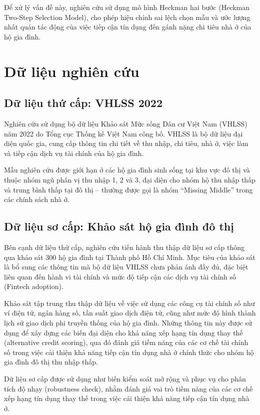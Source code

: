 \documentclass[12pt,a4paper]{report}
\begin{document}
	Để xử lý vấn đề này, nghiên cứu sử dụng mô hình Heckman hai bước (Heckman Two-Step Selection Model), cho phép hiệu chỉnh sai lệch chọn mẫu và ước lượng nhất quán tác động của việc tiếp cận tín dụng đến gánh nặng chi tiêu nhà ở của hộ gia đình.
	
	\section{Dữ liệu nghiên cứu}
	
	\subsection{Dữ liệu thứ cấp: VHLSS 2022}
	
	Nghiên cứu sử dụng bộ dữ liệu Khảo sát Mức sống Dân cư Việt Nam (VHLSS) năm 2022 do Tổng cục Thống kê Việt Nam công bố. VHLSS là bộ dữ liệu đại diện quốc gia, cung cấp thông tin chi tiết về thu nhập, chi tiêu, nhà ở, việc làm và tiếp cận dịch vụ tài chính của hộ gia đình.
	
	Mẫu nghiên cứu được giới hạn ở các hộ gia đình sinh sống tại khu vực đô thị và thuộc nhóm ngũ phân vị thu nhập 1, 2 và 3, đại diện cho nhóm hộ thu nhập thấp và trung bình thấp tại đô thị – thường được gọi là nhóm ``Missing Middle'' trong các chính sách nhà ở.
	
	\subsection{Dữ liệu sơ cấp: Khảo sát hộ gia đình đô thị}
	
	Bên cạnh dữ liệu thứ cấp, nghiên cứu tiến hành thu thập dữ liệu sơ cấp thông qua khảo sát 300 hộ gia đình tại Thành phố Hồ Chí Minh. Mục tiêu của khảo sát là bổ sung các thông tin mà bộ dữ liệu VHLSS chưa phản ánh đầy đủ, đặc biệt liên quan đến hành vi tài chính và mức độ tiếp cận các dịch vụ tài chính số (Fintech adoption).
	
	Khảo sát tập trung thu thập dữ liệu về việc sử dụng các công cụ tài chính số như ví điện tử, ngân hàng số, tần suất giao dịch điện tử, cũng như mức độ hình thành lịch sử giao dịch phi truyền thống của hộ gia đình. Những thông tin này được sử dụng để xây dựng các biến đại diện cho khả năng xếp hạng tín dụng thay thế (alternative credit scoring), qua đó đánh giá tiềm năng của các cơ chế tài chính số trong việc cải thiện khả năng tiếp cận tín dụng nhà ở chính thức cho nhóm hộ gia đình đô thị thu nhập thấp.
	
	
	Dữ liệu sơ cấp được sử dụng như biến kiểm soát mở rộng và phục vụ cho phân tích độ nhạy (robustness check), nhằm đánh giá vai trò tiềm năng của các cơ chế xếp hạng tín dụng thay thế trong việc cải thiện khả năng tiếp cận tín dụng nhà ở.
	
\end{document}
